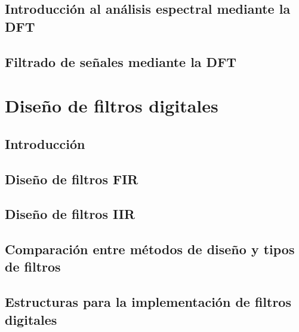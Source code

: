 \documentclass[a4paper]{book}
\begin{document}
\section{Introducción al análisis espectral mediante la DFT}

\section{Filtrado de señales mediante la DFT}


\chapter{Diseño de filtros digitales}

\section{Introducción}

\section{Diseño de filtros FIR}

\section{Diseño de filtros IIR}

\section{Comparación entre métodos de diseño y tipos de filtros}

\section{Estructuras para la implementación de filtros digitales}



%
\end{document}
